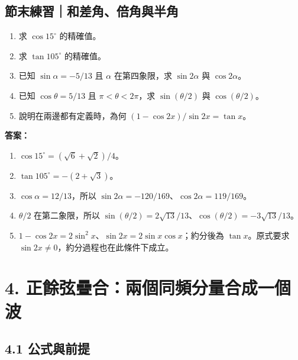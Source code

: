 \documentclass[11pt,a4paper]{article}
\providecommand{\tightlist}{%
  \setlength{\itemsep}{0pt}\setlength{\parskip}{0pt}}
\begin{document}
\begin{HandoutSelfCheck}

\subsection{節末練習｜和差角、倍角與半角}\label{ux7bc0ux672bux7df4ux7fd2ux548cux5deeux89d2ux500dux89d2ux8207ux534aux89d2}

\begin{enumerate}
\def\labelenumi{\arabic{enumi}.}
\tightlist
\item
  求 \(\cos15^\circ\) 的精確值。
\item
  求 \(\tan105^\circ\) 的精確值。
\item
  已知 \(\sin\alpha=-5/13\) 且 \(\alpha\) 在第四象限，求 \(\sin2\alpha\) 與 \(\cos2\alpha\)。
\item
  已知 \(\cos\theta=5/13\) 且 \(\pi<\theta<2\pi\)，求 \(\sin(\theta/2)\) 與 \(\cos(\theta/2)\)。
\item
  說明在兩邊都有定義時，為何 \((1-\cos2x)/\sin2x=\tan x\)。
\end{enumerate}

\textbf{答案：}

\begin{enumerate}
\def\labelenumi{\arabic{enumi}.}
\tightlist
\item
  \(\cos15^\circ=(\sqrt6+\sqrt2)/4\)。
\item
  \(\tan105^\circ=-(2+\sqrt3)\)。
\item
  \(\cos\alpha=12/13\)，所以 \(\sin2\alpha=-120/169\)、\(\cos2\alpha=119/169\)。
\item
  \(\theta/2\) 在第二象限，所以 \(\sin(\theta/2)=2\sqrt{13}/13\)、\(\cos(\theta/2)=-3\sqrt{13}/13\)。
\item
  \(1-\cos2x=2\sin^2x\)、\(\sin2x=2\sin x\cos x\)；約分後為 \(\tan x\)。原式要求 \(\sin2x\ne0\)，約分過程也在此條件下成立。
\end{enumerate}

\end{HandoutSelfCheck}

\section{4. 正餘弦疊合：兩個同頻分量合成一個波}\label{ux6b63ux9918ux5f26ux758aux5408ux5169ux500bux540cux983bux5206ux91cfux5408ux6210ux4e00ux500bux6ce2}

\subsection{4.1 公式與前提}\label{ux516cux5f0fux8207ux524dux63d0}
\end{document}
